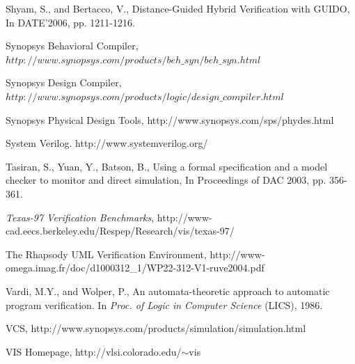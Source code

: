 \documentclass[a4paper, 11pt]{article}
\begin{document}
{\begin{thebibliography}{99}
 Shyam, S., and Bertacco, V., Distance-Guided
        Hybrid Verification with GUIDO, In DATE'2006, pp. 1211-1216.

 Synopsys Behavioral Compiler,
        $http://www.synopsys.com/products/beh\_syn/beh\_syn.html$

 Synopsys Design Compiler,
    $http://www.synopsys.com/products/logic/design\_compiler.html$

 Synopsys Physical Design Tools,
        http://www.synopsys.com/sps/phydes.html

 System Verilog.
        http://www.systemverilog.org/

 Tasiran, S., Yuan, Y., Batson, B., Using a formal
        specification and a model checker to monitor and direct
        simulation, In Proceedings of DAC 2003, pp. 356-361.

 {\em Texas-97 Verification Benchmarks},
    http://www-cad.eecs.berkeley.edu/Respep/Research/vis/texas-97/

 The Rhapsody UML Verification Environment, 
	http://www-omega.imag.fr/doc/d1000312\_1/WP22-312-V1-ruve2004.pdf 


 Vardi, M.Y., and Wolper, P., An automata-theoretic approach
    to automatic program verification. In {\em Proc. of Logic in Computer
    Science} (LICS), 1986.

 VCS,
    http://www.synopsys.com/products/simulation/simulation.html 

 VIS Homepage, http://vlsi.colorado.edu/$\sim$vis 
\end{thebibliography}
}
\end{document}
